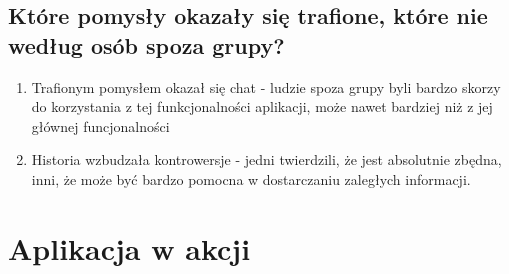 \documentclass[12pt]{article}
\begin{document}
\subsection{Które pomysły okazały się trafione, które nie według osób spoza grupy?}
\begin{enumerate}
	\item Trafionym pomysłem okazał się chat - ludzie spoza grupy byli bardzo skorzy do korzystania z tej funkcjonalności aplikacji, może nawet bardziej niż z jej głównej funcjonalności
	\item Historia wzbudzała kontrowersje - jedni twierdzili, że jest absolutnie zbędna, inni, że może być bardzo pomocna w dostarczaniu zaległych informacji.
\end{enumerate}


\section {Aplikacja w akcji}
\clearpage
\end{document}
